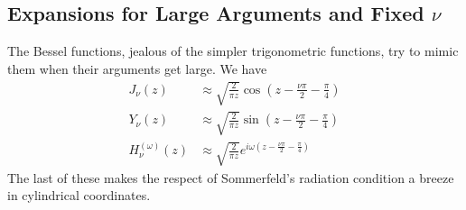 \subsection{Expansions for Large Arguments and Fixed $\nu$}
The Bessel functions, jealous of the simpler trigonometric functions, 
try to mimic them when their arguments get large. We have
  \begin{subequations}
  \begin{align}
   J_\nu(z)		&\approx \sqrt{\frac{2}{\pi z}}\cos\left(z-\frac{\nu\pi}{2}-\frac{\pi}{4}\right)	\\
   Y_\nu(z)		&\approx \sqrt{\frac{2}{\pi z}}\sin\left(z-\frac{\nu\pi}{2}-\frac{\pi}{4}\right)	\\
   H_\nu^{(\omega)}(z)	&\approx \sqrt{\frac{2}{\pi z}}e^{i\omega\left(z-\frac{\nu\pi}{2}-\frac{\pi}{4}\right)}\label{eq:app.Bessel.asymptoticHankel}
  \end{align}
  \end{subequations}
The last of these makes the respect of Sommerfeld's radiation condition a breeze in cylindrical coordinates.
